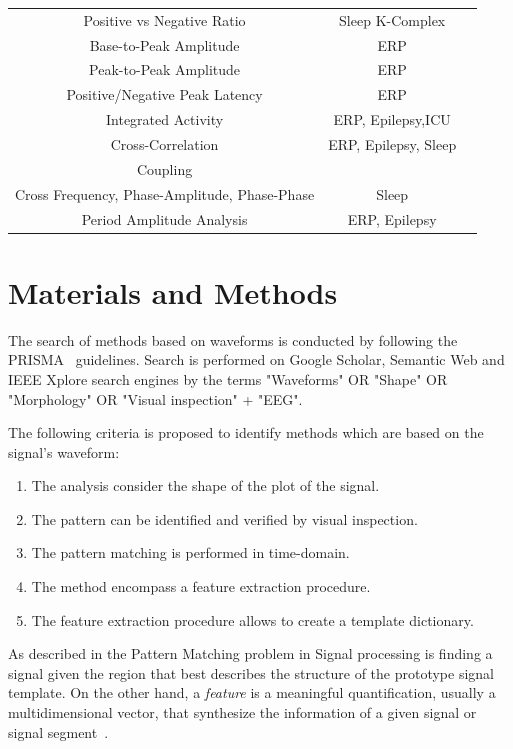\documentclass[brainsci,article,submit,moreauthors,pdftex,10pt,a4paper]{mdpi}
\begin{document}
\begin{table}[H]
\begin{tabular}{ccc}
Positive vs Negative Ratio    & Sleep K-Complex &  \citep{EEGIntro} \\
Base-to-Peak Amplitude     & ERP  &  \citep{Cole2017} \\
Peak-to-Peak Amplitude     & ERP  &  \citep{Mak2012} \\
Positive/Negative Peak Latency                                 & ERP  & \citep{Mak2012}  \\
Integrated Activity               & ERP, Epilepsy,ICU & \citep{Uchida1999, Shah2015} \\
Cross-Correlation                & ERP, Epilepsy, Sleep & \citep{Cacioppo2007, Shah2015} \\
Coupling \\ Cross Frequency,  Phase-Amplitude, Phase-Phase     & Sleep & \citep{Cole2017} \\
Period Amplitude Analysis  & ERP, Epilepsy & \citep{Uchida1999,Cacioppo2007, Shah2015} \\
\bottomrule
\end{tabular}
\label{tab:methods}
\end{table}


\section{Materials and Methods}

The search of methods based on waveforms is conducted by following the PRISMA~\citep{Moher2009} guidelines.  Search is performed on Google Scholar, Semantic Web and IEEE Xplore search engines by the terms "Waveforms" OR "Shape" OR "Morphology" OR "Visual inspection" + "EEG".

The following criteria is proposed to identify methods which are based on the signal's waveform:

\begin{enumerate}
\item The analysis consider the shape of the plot of the signal.
\item The pattern can be identified and verified by visual inspection.
\item The pattern matching is performed in time-domain.
\item The method encompass a feature extraction procedure.
\item The feature extraction procedure allows to create a template dictionary.
\end{enumerate}

As described in \citep{allen2004signal} the Pattern Matching problem in Signal processing is finding a signal given the region that best describes the structure of the prototype signal template.   On the other hand, a \textit{feature} is a meaningful quantification, usually a multidimensional vector, that synthesize the information of a given signal or signal segment~\citep{WolpawJonathanR2012}.   
\end{document}
